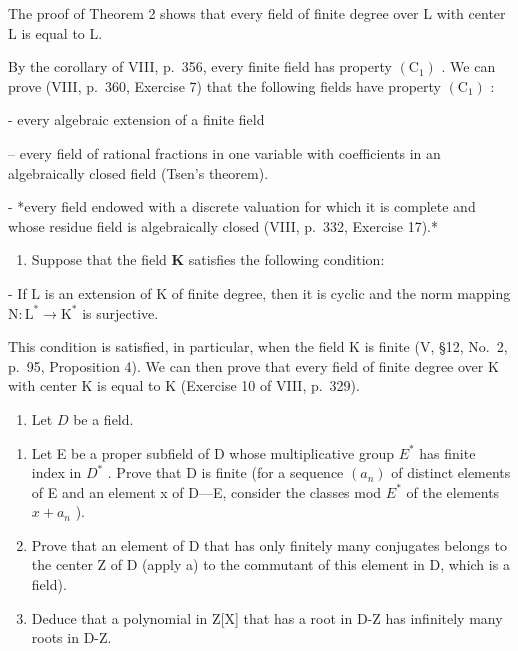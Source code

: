 The proof of Theorem 2 shows that every field of finite degree over L with center L is equal to L.

By the corollary of VIII, p.~356, every finite field has property \((\mathrm{C}_{1})\) . We can prove (VIII, p.~360, Exercise 7) that the following fields have property \((\mathrm{C}_{1})\) :

- every algebraic extension of a finite field

-- every field of rational fractions in one variable with coefficients in an algebraically closed field (Tsen's theorem).

- *every field endowed with a discrete valuation for which it is complete and whose residue field is algebraically closed (VIII, p.~332, Exercise 17).*

\begin{enumerate}
\def\labelenumi{\arabic{enumi})}
\setcounter{enumi}{2}
\tightlist
\item
  Suppose that the field \(\mathbf{K}\) satisfies the following condition:
\end{enumerate}

- If \(\mathrm{L}\) is an extension of \(\mathrm{K}\) of finite degree, then it is cyclic and the norm mapping \(\mathrm{N}:\mathrm{L}^{*}\to \mathrm{K}^{*}\) is surjective.

This condition is satisfied, in particular, when the field K is finite (V, §12, No.~2, p.~95, Proposition 4). We can then prove that every field of finite degree over K with center K is equal to K (Exercise 10 of VIII, p.~329).


\begin{enumerate}
\def\labelenumi{\arabic{enumi})}
\tightlist
\item
  Let \(D\) be a field.
\end{enumerate}

\begin{enumerate}
\def\labelenumi{\alph{enumi})}
\item
  Let E be a proper subfield of D whose multiplicative group \(E^{*}\) has finite index in \(D^{*}\) . Prove that D is finite (for a sequence \((a_{n})\) of distinct elements of E and an element x of D---E, consider the classes mod \(E^{*}\) of the elements \(x + a_{n}\) ).
\item
  Prove that an element of D that has only finitely many conjugates belongs to the center Z of D (apply a) to the commutant of this element in D, which is a field).
\item
  Deduce that a polynomial in Z{[}X{]} that has a root in D-Z has infinitely many roots in D-Z.
\end{enumerate}

